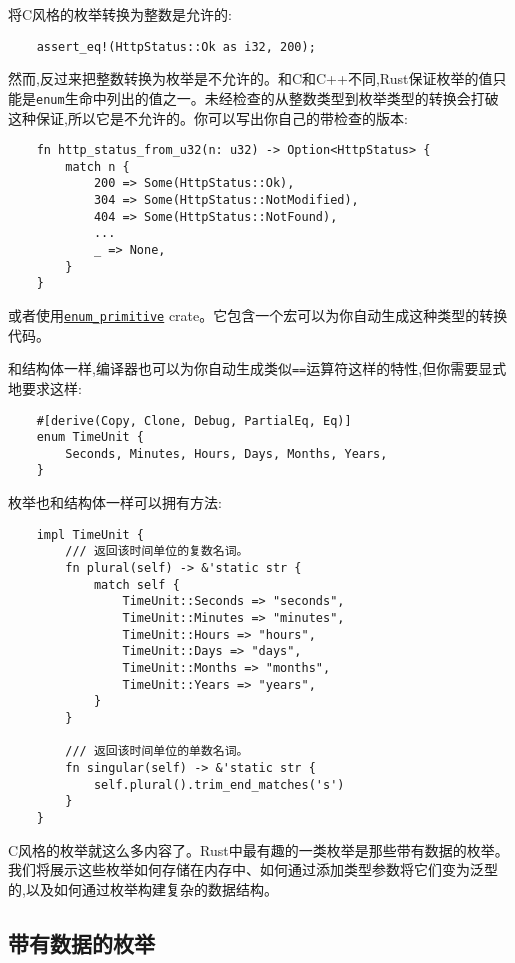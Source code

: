 将C风格的枚举转换为整数是允许的:
\begin{verbatim}
    assert_eq!(HttpStatus::Ok as i32, 200);
\end{verbatim}

然而,反过来把整数转换为枚举是不允许的。和C和C++不同,Rust保证枚举的值只能是\texttt{enum}生命中列出的值之一。未经检查的从整数类型到枚举类型的转换会打破这种保证,所以它是不允许的。你可以写出你自己的带检查的版本:
\begin{verbatim}
    fn http_status_from_u32(n: u32) -> Option<HttpStatus> {
        match n {
            200 => Some(HttpStatus::Ok),
            304 => Some(HttpStatus::NotModified),
            404 => Some(HttpStatus::NotFound),
            ...
            _ => None,
        }
    }
\end{verbatim}

或者使用\href{https://crates.io/crates/enum_primitive}{\texttt{enum\_primitive}} crate。它包含一个宏可以为你自动生成这种类型的转换代码。

和结构体一样,编译器也可以为你自动生成类似\texttt{==}运算符这样的特性,但你需要显式地要求这样:
\begin{verbatim}
    #[derive(Copy, Clone, Debug, PartialEq, Eq)]
    enum TimeUnit {
        Seconds, Minutes, Hours, Days, Months, Years,
    }
\end{verbatim}

枚举也和结构体一样可以拥有方法:
\begin{verbatim}
    impl TimeUnit {
        /// 返回该时间单位的复数名词。
        fn plural(self) -> &'static str {
            match self {
                TimeUnit::Seconds => "seconds",
                TimeUnit::Minutes => "minutes",
                TimeUnit::Hours => "hours",
                TimeUnit::Days => "days",
                TimeUnit::Months => "months",
                TimeUnit::Years => "years",
            }
        }

        /// 返回该时间单位的单数名词。
        fn singular(self) -> &'static str {
            self.plural().trim_end_matches('s')
        }
    }
\end{verbatim}

C风格的枚举就这么多内容了。Rust中最有趣的一类枚举是那些带有数据的枚举。我们将展示这些枚举如何存储在内存中、如何通过添加类型参数将它们变为泛型的,以及如何通过枚举构建复杂的数据结构。

\subsection{带有数据的枚举}

